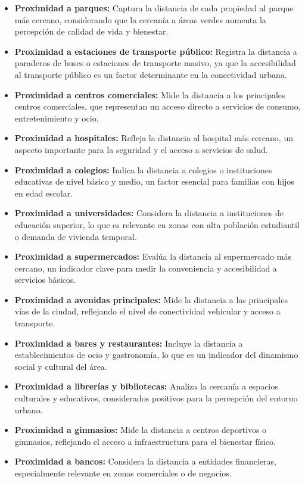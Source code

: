 \documentclass[a4paper]{article}
\theoremstyle{remark}
\theoremstyle{definition}
\begin{document}
\begin{multicols}{2}
\begin{itemize}[leftmargin=*]
    \item \textbf{Proximidad a parques:} Captura la distancia de cada propiedad al parque más cercano, considerando que la cercanía a áreas verdes aumenta la percepción de calidad de vida y bienestar.
    \item \textbf{Proximidad a estaciones de transporte público:} Registra la distancia a paraderos de buses o estaciones de transporte masivo, ya que la accesibilidad al transporte público es un factor determinante en la conectividad urbana.
    \item \textbf{Proximidad a centros comerciales:} Mide la distancia a los principales centros comerciales, que representan un acceso directo a servicios de consumo, entretenimiento y ocio.
    \item \textbf{Proximidad a hospitales:} Refleja la distancia al hospital más cercano, un aspecto importante para la seguridad y el acceso a servicios de salud.
    \item \textbf{Proximidad a colegios:} Indica la distancia a colegios o instituciones educativas de nivel básico y medio, un factor esencial para familias con hijos en edad escolar.
    \item \textbf{Proximidad a universidades:} Considera la distancia a instituciones de educación superior, lo que es relevante en zonas con alta población estudiantil o demanda de vivienda temporal.
    \item \textbf{Proximidad a supermercados:} Evalúa la distancia al supermercado más cercano, un indicador clave para medir la conveniencia y accesibilidad a servicios básicos.
    \item \textbf{Proximidad a avenidas principales:} Mide la distancia a las principales vías de la ciudad, reflejando el nivel de conectividad vehicular y acceso a transporte.
    \item \textbf{Proximidad a bares y restaurantes:} Incluye la distancia a establecimientos de ocio y gastronomía, lo que es un indicador del dinamismo social y cultural del área.
    \item \textbf{Proximidad a librerías y bibliotecas:} Analiza la cercanía a espacios culturales y educativos, considerados positivos para la percepción del entorno urbano.
    \item \textbf{Proximidad a gimnasios:} Mide la distancia a centros deportivos o gimnasios, reflejando el acceso a infraestructura para el bienestar físico.
    \item \textbf{Proximidad a bancos:} Considera la distancia a entidades financieras, especialmente relevante en zonas comerciales o de negocios.
\end{itemize}
\end{multicols}
\end{document}
